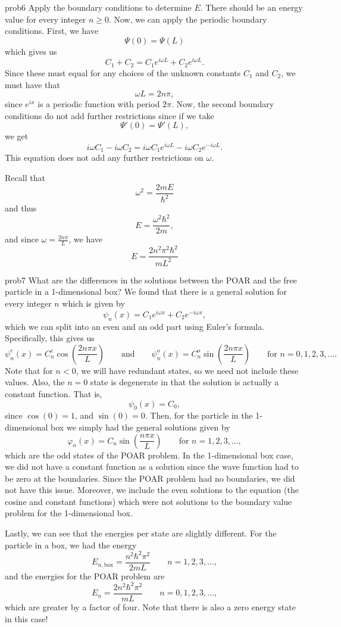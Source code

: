 \documentclass{article}
\begin{document}
\begin{solution}{}{prob6}
		Apply the boundary conditions to determine $E$. There should be an energy value for every integer $n\geq 0$.
		\tcblower
		Now, we can apply the periodic boundary conditions. First, we have
		\[
		\Psi(0)=\Psi(L)
		\]
		which gives us
		\[
		C_1+C_2 = C_1 e^{i \omega L} + C_2 e^{i\omega L}.
		\]
		Since these must equal for any choices of the unknown constants $C_1$ and $C_2$, we must have that
		\[
		\omega L = 2n\pi,
		\]
		since $e^{ix}$ is a periodic function with period $2\pi$. Now, the second boundary conditions do not add further restrictions since if we take
		\[
		\Psi'(0)=\Psi'(L),
		\]
		we get
		\[
		i\omega C_1-i\omega C_2=i\omega C_1 e^{i\omega L}-i\omega C_2 e^{-i\omega L}.
		\]
		This equation does not add any further restrictions on $\omega$.
		
		Recall that
		\[
		\omega^2 = \frac{2mE}{\hbar^2}
		\]
		and thus
		\[
		E=\frac{\omega^2\hbar^2}{2m},
		\]
		and since $\omega=\frac{2n\pi}{L}$, we have
		\[
		\boxed{E=\frac{2n^2\pi^2\hbar^2}{mL^2}}
		\]
	\end{solution}

\begin{solution}{}{prob7}
		What are the differences in the solutions between the POAR and the free particle in a 1-dimensional box?
		\tcblower
		We found that there is a general solution for every integer $n$ which is given by
		\[
		\psi_n(x) = C_1e^{i\omega x}+C_2 e^{-i\omega x},
		\]
		which we can split into an even and an odd part using Euler's formula. Specifically, this gives us
		\[
		\boxed{\psi_n^e(x) = C_n^e \cos\left(\frac{2n\pi x}{L}\right)} \qquad \textrm{and} \qquad \boxed{\psi_n^o(x) = C_n^o \sin\left(\frac{2n\pi x}{L}\right)} \qquad \textrm{for $n=0,1,2,3,\dots$}.
		\]
		Note that for $n<0$, we will have redundant states, so we need not include these values. Also, the $n=0$ state is degenerate in that the solution is actually a constant function. That is,
		\[
		\psi_0(x) = C_0,
		\]
		since $\cos(0)=1$, and $\sin(0)=0$.	Then, for the particle in the 1-dimensional box we simply had the general solutions given by
		\[
		\varphi_n(x) = C_n \sin\left(\frac{n\pi x}{L}\right) \qquad \textrm{for $n=1,2,3,\dots$},
		\]
		which are the odd states of the POAR problem. In the 1-dimensional box case, we did not have a constant function as a solution since the wave function had to be zero at the boundaries. Since the POAR problem had no boundaries, we did not have this issue. Moreover, we include the even solutions to the equation (the cosine and constant functions) which were not solutions to the boundary value problem for the 1-dimensional box.
		
		Lastly, we can see that the energies per state are slightly different. For the particle in a box, we had the energy
		\[
		E_{n,\textrm{box}} = \frac{n^2\hbar^2 \pi^2}{2mL} \qquad n=1,2,3,\dots,
		\]
		and the energies for the POAR problem are
		\[
		E_n = \frac{2n^2\hbar^2\pi^2}{mL} \qquad n=0,1,2,3,\dots,
		\]
		which are greater by a factor of four. Note that there is also a zero energy state in this case!
	\end{solution}
\end{document}
